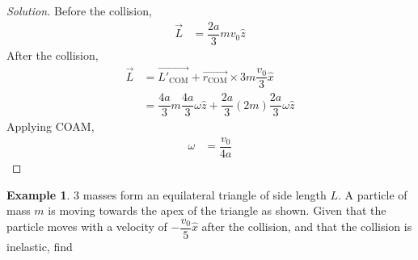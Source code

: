 \documentclass[fleqn, a4paper, 12pt]{article}
\theoremstyle{definition}
\newtheorem{example}{Example}
\theoremstyle{theorem}
\newenvironment{solution}
{\begin{proof}[Solution]\let\qed\relax}
	{\end{proof}}
\begin{document}
\begin{solution}
	Before the collision,
	\begin{align*}
		\overrightarrow{L} &= \dfrac{2a}{3} m v_0 \hat{z}
	\end{align*}
	After the collision,
	\begin{align*}
		\overrightarrow{L} &= \overrightarrow{L'_{\text{COM}}} + \overrightarrow{r_{\text{COM}}} \times 3 m \dfrac{v_0}{3} \hat{x}\\
		&= \dfrac{4a}{3} m \dfrac{4a}{3} \omega \hat{z} + \dfrac{2a}{3} (2m) \dfrac{2a}{3} \omega \hat{z}
	\end{align*}
	Applying COAM,
	\begin{align*}
		\omega &= \dfrac{v_0}{4a}
	\end{align*}
\end{solution}

\begin{example}
	3 masses form an equilateral triangle of side length $L$. A particle of mass $m$ is moving towards the apex of the triangle as shown. Given that the particle moves with a velocity of $-\dfrac{v_0}{5} \hat{x}$ after the collision, and that the collision is inelastic, find \\
\end{example}
\end{document}
